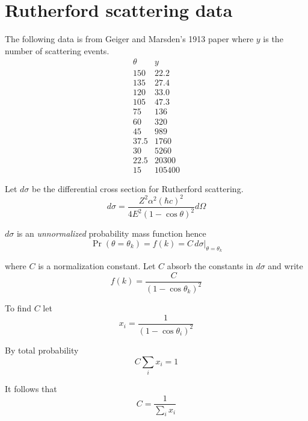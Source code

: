 

\section*{Rutherford scattering data}

The following data is from Geiger and Marsden's 1913 paper
where $y$ is the number of scattering events.
\begin{equation*}
\begin{matrix}
\theta & y\\
150 & 22.2\\
135 & 27.4\\
120 & 33.0\\
105 & 47.3\\
75 & 136\\
60 & 320\\
45 & 989\\
37.5 & 1760\\
30 & 5260\\
22.5 & 20300\\
15 & 105400
\end{matrix}
\end{equation*}

Let $d\sigma$ be the differential cross section for Rutherford scattering.
\begin{equation*}
d\sigma=\frac{Z^2\alpha^2(\hbar c)^2}{4E^2(1-\cos\theta)^2}d\Omega
\end{equation*}

$d\sigma$ is an {\it unnormalized} probability mass function hence
\begin{equation*}
\Pr(\theta=\theta_k)=f(k)=C\,d\sigma\big|_{\theta=\theta_k}
\end{equation*}

where $C$ is a normalization constant.
Let $C$ absorb the constants in $d\sigma$ and write
\begin{equation*}
f(k)=\frac{C}{(1-\cos\theta_k)^2}
\end{equation*}

To find $C$ let
\begin{equation*}
x_i=\frac{1}{(1-\cos\theta_i)^2}
\end{equation*}

By total probability
\begin{equation*}
C\sum_i x_i=1
\end{equation*}

It follows that
\begin{equation*}
C=\frac{1}{\sum_i x_i}
\end{equation*}

